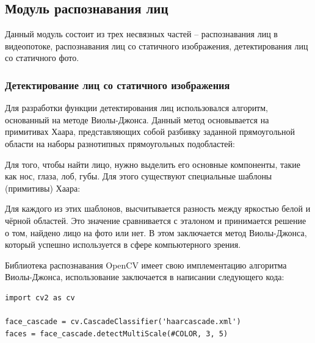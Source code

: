 \subsection{Модуль распознавания лиц}

Данный модуль состоит из трех несвязных частей -- распознавания лиц
в видеопотоке, распознавания лиц со статичного изображения, детектирования лиц
со статичного фото.

\subsubsection{Детектирование лиц со статичного изображения}

Для разработки функции детектирования лиц использовался алгоритм, основанный на
методе Виолы-Джонса. Данный метод основывается на примитивах Хаара,
представляющих собой разбивку заданной прямоугольной области на наборы
разнотипных прямоугольных подобластей:


Для того, чтобы найти лицо, нужно выделить его основные компоненты, такие как
нос, глаза, лоб, губы. Для этого существуют специальные шаблоны (примитивы)
Хаара:


Для каждого из этих шаблонов, высчитывается разность между яркостью белой
и чёрной областей. Это значение сравнивается с эталоном и принимается решение
о том, найдено лицо на фото или нет. В этом заключается метод Виолы-Джонса,
который успешно используется в сфере компьютерного зрения.


Библиотека распознавания OpenCV имеет свою имплементацию алгоритма
Виолы-Джонса, использование заключается в написании следующего кода:

\lstset{language=Python, basicstyle=\normalsize, keepspaces=true, numbers=left, breaklines=true,
frame=single, showstringspaces=true, columns=fullflexible} 
\begin{lstlisting}
import cv2 as cv

face_cascade = cv.CascadeClassifier('haarcascade.xml')
faces = face_cascade.detectMultiScale(#COLOR, 3, 5)
\end{lstlisting}



